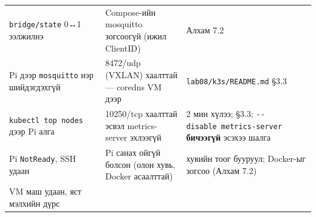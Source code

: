 \begin{longtable}[]{@{}lll@{}}
\begin{minipage}[t]{0.30\columnwidth}\raggedright
\texttt{bridge/state} 0↔1 ээлжилнэ\strut
\end{minipage} & \begin{minipage}[t]{0.30\columnwidth}\raggedright
Compose-ийн mosquitto зогсоогүй (ижил ClientID)\strut
\end{minipage} & \begin{minipage}[t]{0.30\columnwidth}\raggedright
Алхам 7.2\strut
\end{minipage}\tabularnewline
\begin{minipage}[t]{0.30\columnwidth}\raggedright
Pi дээр \texttt{mosquitto} нэр шийдэгдэхгүй\strut
\end{minipage} & \begin{minipage}[t]{0.30\columnwidth}\raggedright
8472/udp (VXLAN) хаалттай --- coredns VM дээр\strut
\end{minipage} & \begin{minipage}[t]{0.30\columnwidth}\raggedright
\texttt{lab08/\allowbreak{}k3s/\allowbreak{}README.\allowbreak{}md} §3.3\strut
\end{minipage}\tabularnewline
\begin{minipage}[t]{0.30\columnwidth}\raggedright
\texttt{kubectl\ top\ nodes} дээр Pi алга\strut
\end{minipage} & \begin{minipage}[t]{0.30\columnwidth}\raggedright
10250/tcp хаалттай эсвэл metrics-server эхлээгүй\strut
\end{minipage} & \begin{minipage}[t]{0.30\columnwidth}\raggedright
2 мин хүлээ; §3.3; \texttt{-\/\allowbreak{}-disable\ metrics-server} \textbf{бичээгүй} эсэхээ шалга\strut
\end{minipage}\tabularnewline
\begin{minipage}[t]{0.30\columnwidth}\raggedright
Pi \texttt{NotReady}, SSH удаан\strut
\end{minipage} & \begin{minipage}[t]{0.30\columnwidth}\raggedright
Pi санах ойгүй болсон (олон хувь, Docker асаалттай)\strut
\end{minipage} & \begin{minipage}[t]{0.30\columnwidth}\raggedright
хувийн тоог бууруул; Docker-ыг зогсоо (Алхам 7.2)\strut
\end{minipage}\tabularnewline
\begin{minipage}[t]{0.30\columnwidth}\raggedright
VM маш удаан, яст мэлхийн дүрс\strut
\end{minipage} & \begin{minipage}[t]{0.30\columnwidth}\raggedright

\end{minipage}
\end{longtable}
